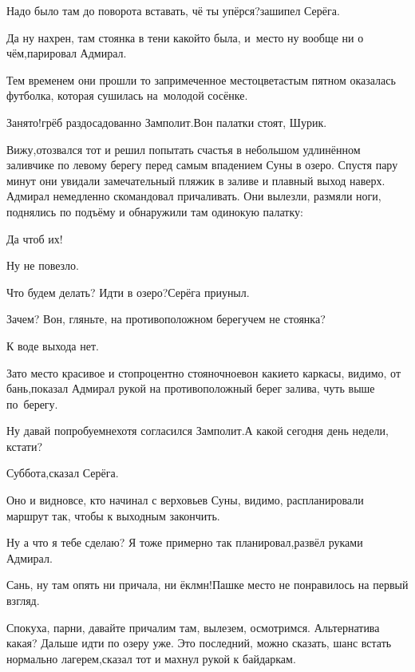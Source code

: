 \diagdash Надо было там до поворота вставать, чё ты упёрся?\mdash зашипел Серёга.

\diagdash Да ну нахрен, там стоянка в тени какой\sdash то была, и~место ну вообще ни о чём,\mdash парировал Адмирал.

Тем временем они прошли то запримеченное место\mdash цветастым пятном оказалась футболка, которая сушилась на~молодой сосёнке.

\diagdash Занято!\mdash грёб раздосадованно Замполит.\mdash Вон палатки стоят, Шурик.

\diagdash Вижу,\mdash отозвался тот и решил попытать счастья в небольшом удлинённом заливчике по левому берегу перед самым впадением Суны в озеро. Спустя пару минут они увидали замечательный пляжик в заливе и плавный выход наверх. Адмирал немедленно скомандовал причаливать. Они вылезли, размяли ноги, поднялись по подъёму и обнаружили там одинокую палатку:

\diagdash Да чтоб их!

\diagdash Ну не повезло.

\diagdash Что будем делать? Идти в озеро?\mdash Серёга приуныл.

\diagdash Зачем? Вон, гляньте, на противоположном берегу\mdash чем не стоянка? %

\diagdash К воде выхода нет.

\diagdash Зато место красивое и стопроцентно стояночное\mdash вон какие\sdash то каркасы, видимо, от бань,\mdash показал Адмирал рукой на противоположный берег залива, чуть выше по~берегу.

\diagdash Ну давай попробуем\myldots{}\mdash нехотя согласился Замполит.\mdash А какой сегодня день недели, кстати?

\diagdash Суббота,\mdash сказал Серёга.

\diagdash Оно и видно\mdash все, кто начинал с верховьев Суны, видимо, распланировали маршрут так, чтобы к выходным закончить.

\diagdash Ну а что я тебе сделаю? Я тоже примерно так планировал,\mdash развёл руками Адмирал.

\diagdash Сань, ну там опять ни причала, ни ёклмн!\mdash Пашке место не понравилось на первый взгляд.

\diagdash Спокуха, парни, давайте причалим там, вылезем, осмотримся. Альтернатива какая? Дальше идти по озеру уже. Это последний, можно сказать, шанс встать нормально лагерем,\mdash сказал тот и махнул рукой к байдаркам.

